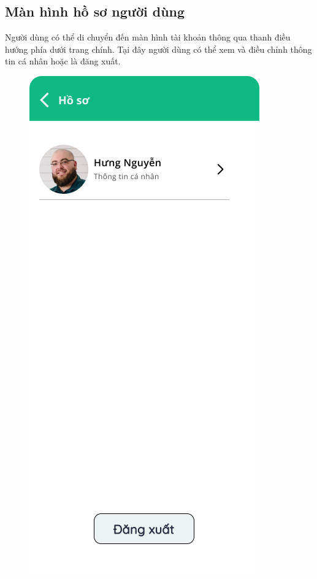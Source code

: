 \subsection{Màn hình hồ sơ người dùng}
Người dùng có thể di chuyển đến màn hình tài khoản thông qua thanh điều hướng phía dưới trang chính. Tại đây người dùng có thể xem và điều chỉnh thông tin cá nhân hoặc là đăng xuất.
\begin{figure}[!htb]
    \centering
    \begin{minipage}{0.32\textwidth}
     \centering
     \includegraphics[width=1.06\linewidth]{Images/UI figma/Profile.png}

\end{minipage}
\end{figure}
